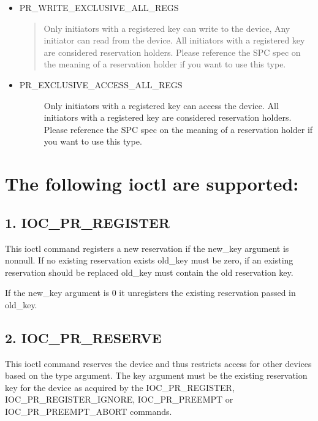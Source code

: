 \documentclass[a4paper,11pt,english]{sphinxmanual}
\begin{document}
\begin{itemize}
\item {} 
PR\_WRITE\_EXCLUSIVE\_ALL\_REGS
\begin{quote}

Only initiators with a registered key can write to the device,
Any initiator can read from the device.
All initiators with a registered key are considered reservation
holders.
Please reference the SPC spec on the meaning of a reservation
holder if you want to use this type.
\end{quote}

\item {} \begin{description}
\item[{PR\_EXCLUSIVE\_ACCESS\_ALL\_REGS}] \leavevmode
Only initiators with a registered key can access the device.
All initiators with a registered key are considered reservation
holders.
Please reference the SPC spec on the meaning of a reservation
holder if you want to use this type.

\end{description}

\end{itemize}


\section{The following ioctl are supported:}
\label{\detokenize{pr:the-following-ioctl-are-supported}}

\subsection{1. IOC\_PR\_REGISTER}
\label{\detokenize{pr:ioc-pr-register}}
This ioctl command registers a new reservation if the new\_key argument
is non\sphinxhyphen{}null.  If no existing reservation exists old\_key must be zero,
if an existing reservation should be replaced old\_key must contain
the old reservation key.

If the new\_key argument is 0 it unregisters the existing reservation passed
in old\_key.


\subsection{2. IOC\_PR\_RESERVE}
\label{\detokenize{pr:ioc-pr-reserve}}
This ioctl command reserves the device and thus restricts access for other
devices based on the type argument.  The key argument must be the existing
reservation key for the device as acquired by the IOC\_PR\_REGISTER,
IOC\_PR\_REGISTER\_IGNORE, IOC\_PR\_PREEMPT or IOC\_PR\_PREEMPT\_ABORT commands.
\end{document}
